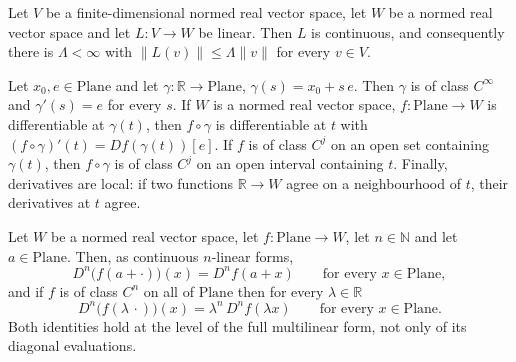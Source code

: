 \begin{proposition}
Let $V$ be a finite-dimensional normed real vector space, let $W$ be a normed real vector
space and let $L\colon V\to W$ be linear.  Then $L$ is continuous, and consequently there is
$\Lambda<\infty$ with $\lVert L(v)\rVert\le\Lambda\lVert v\rVert$ for every $v\in V$.
\end{proposition}

\begin{proposition}
Let $x_0,e\in\mathrm{Plane}$ and let $\gamma\colon\mathbb{R}\to\mathrm{Plane}$,
$\gamma(s)=x_0+s\,e$.  Then $\gamma$ is of class $C^\infty$ and
$\gamma'(s)=e$ for every $s$.  If $W$ is a normed real vector space, $f\colon\mathrm{Plane}\to W$
is differentiable at $\gamma(t)$, then $f\circ\gamma$ is differentiable at $t$ with
$(f\circ\gamma)'(t)=Df(\gamma(t))[e]$.  If $f$ is of class $C^{j}$ on an open set containing
$\gamma(t)$, then $f\circ\gamma$ is of class $C^{j}$ on an open interval containing $t$.
Finally, derivatives are local: if two functions $\mathbb{R}\to W$ agree on a neighbourhood of
$t$, their derivatives at $t$ agree.
\end{proposition}

\begin{proposition}
Let $W$ be a normed real vector space, let $f\colon\mathrm{Plane}\to W$, let $n\in\mathbb{N}$
and let $a\in\mathrm{Plane}$.  Then, as continuous $n$-linear forms,
\[
  D^{n}\bigl(f(a+\cdot)\bigr)(x)=D^{n}f(a+x)\qquad\text{for every }x\in\mathrm{Plane},
\]
and if $f$ is of class $C^{n}$ on all of $\mathrm{Plane}$ then for every $\lambda\in\mathbb{R}$
\[
  D^{n}\bigl(f(\lambda\,\cdot)\bigr)(x)=\lambda^{n}\,D^{n}f(\lambda x)
  \qquad\text{for every }x\in\mathrm{Plane}.
\]
Both identities hold at the level of the full multilinear form, not only of its diagonal
evaluations.
\end{proposition}

